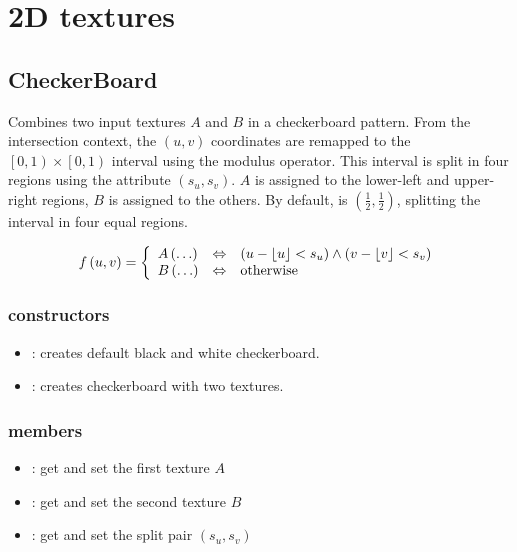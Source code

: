 \section{2D textures} %



\subsection{CheckerBoard}\label{textures.CheckerBoard}

Combines two input textures $A$ and $B$ in a checkerboard pattern.  From the intersection context, the $\left(u, v\right)$ coordinates are remapped to the $\left[0, 1\right) \times \left[0, 1\right)$ interval using the modulus operator.  This interval is split in four regions using the  attribute $\left(s_u, s_v\right)$.  $A$ is assigned to the lower-left and upper-right regions, $B$ is assigned to the others.  By default,  is $\left(\frac 1 2, \frac 1 2\right)$, splitting the interval in four equal regions.

\begin{equation}
	f\left(u, v\right) = \left\{
		\begin{array}{lcl}
			A\left(\ldots\right) & \Leftrightarrow &
				\left(u - \left\lfloor u \right\rfloor < s_u\right) \wedge
				\left(v - \left\lfloor v \right\rfloor < s_v\right) \\
			B\left(\ldots\right) & \Leftrightarrow & \textnormal{otherwise}
		\end{array}
	\right.
\end{equation}

\subsubsection*{constructors}
\begin{itemize}
	\item {}:
		creates default black and white checkerboard.
	\item {}:
		creates checkerboard with two textures.
\end{itemize}

\subsubsection*{members}
\begin{itemize}
	\item {}:
		get and set the first texture $A$
	\item {}:
		get and set the second texture $B$
	\item {}:
		get and set the split pair $\left(s_u, s_v\right)$
\end{itemize}




